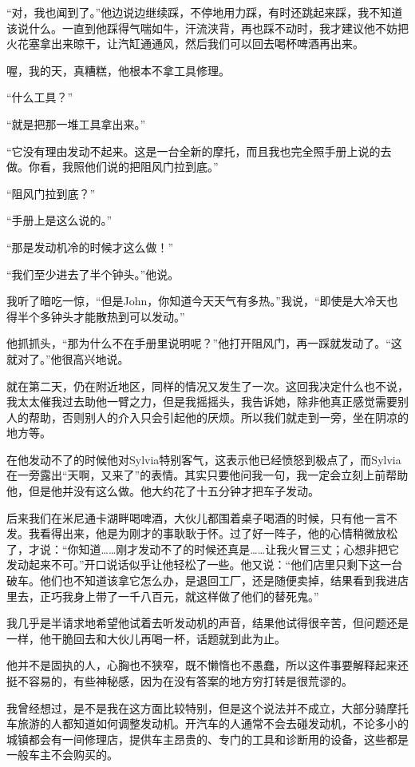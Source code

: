\documentclass[UTF8]{article}
\begin{document}
\par “对，我也闻到了。”他边说边继续踩，不停地用力踩，有时还跳起来踩，我不知道该说什么。一直到他踩得气喘如牛，汗流浃背，再也踩不动时，我才建议他不妨把火花塞拿出来晾干，让汽缸通通风，然后我们可以回去喝杯啤酒再出来。
\par 喔，我的天，真糟糕，他根本不拿工具修理。
\par “什么工具？”
\par “就是把那一堆工具拿出来。”
\par “它没有理由发动不起来。这是一台全新的摩托，而且我也完全照手册上说的去做。你看，我照他们说的把阻风门拉到底。”
\par “阻风门拉到底？”
\par “手册上是这么说的。”
\par “那是发动机冷的时候才这么做！”
\par “我们至少进去了半个钟头。”他说。
\par 我听了暗吃一惊，“但是John，你知道今天天气有多热。”我说，“即使是大冷天也得半个多钟头才能散热到可以发动。”
\par 他抓抓头，“那为什么不在手册里说明呢？”他打开阻风门，再一踩就发动了。“这就对了。”他很高兴地说。
\par 就在第二天，仍在附近地区，同样的情况又发生了一次。这回我决定什么也不说，我太太催我过去助他一臂之力，但是我摇摇头，我告诉她，除非他真正感觉需要别人的帮助，否则别人的介入只会引起他的厌烦。所以我们就走到一旁，坐在阴凉的地方等。
\par 在他发动不了的时候他对Sylvia特别客气，这表示他已经愤怒到极点了，而Sylvia在一旁露出“天啊，又来了”的表情。其实只要他问我一句，我一定会立刻上前帮助他，但是他并没有这么做。他大约花了十五分钟才把车子发动。
\par 后来我们在米尼通卡湖畔喝啤酒，大伙儿都围着桌子喝酒的时候，只有他一言不发。我看得出来，他是为刚才的事耿耿于怀。过了好一阵子，他的心情稍微放松了，才说：“你知道……刚才发动不了的时候还真是……让我火冒三丈；心想非把它发动起来不可。”开口说话似乎让他轻松了一些。他又说：“他们店里只剩下这一台破车。他们也不知道该拿它怎么办，是退回工厂，还是随便卖掉，结果看到我进店里去，正巧我身上带了一千八百元，就这样做了他们的替死鬼。”
\par 我几乎是半请求地希望他试着去听发动机的声音，结果他试得很辛苦，但问题还是一样，他干脆回去和大伙儿再喝一杯，话题就到此为止。
\par 他并不是固执的人，心胸也不狭窄，既不懒惰也不愚蠢，所以这件事要解释起来还挺不容易的，有些神秘感，因为在没有答案的地方穷打转是很荒谬的。
\par 我曾经想过，是不是我在这方面比较特别，但是这个说法并不成立，大部分骑摩托车旅游的人都知道如何调整发动机。开汽车的人通常不会去碰发动机，不论多小的城镇都会有一间修理店，提供车主昂贵的、专门的工具和诊断用的设备，这些都是一般车主不会购买的。
\end{document}

